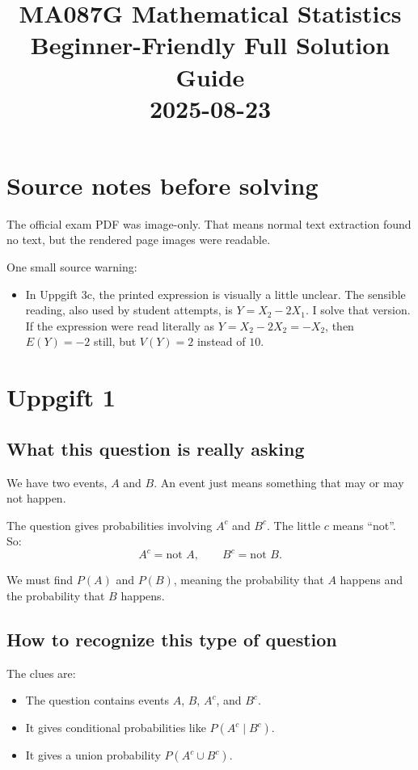 \documentclass[11pt,a4paper]{article}
\title{MA087G Mathematical Statistics\\Beginner-Friendly Full Solution Guide\\2025-08-23}
\author{}
\date{}
\begin{document}
\maketitle

\section*{Source notes before solving}
The official exam PDF was image-only. That means normal text extraction found no text, but the rendered page images were readable.

One small source warning:
\begin{itemize}[leftmargin=*]
    \item In Uppgift 3c, the printed expression is visually a little unclear. The sensible reading, also used by student attempts, is \(Y=X_2-2X_1\). I solve that version. If the expression were read literally as \(Y=X_2-2X_2=-X_2\), then \(E(Y)=-2\) still, but \(V(Y)=2\) instead of \(10\).
\end{itemize}

\section*{Uppgift 1}

\subsection*{What this question is really asking}
We have two events, \(A\) and \(B\). An event just means something that may or may not happen.

The question gives probabilities involving \(A^c\) and \(B^c\). The little \(c\) means ``not''. So:
\[
A^c=\text{not } A,\qquad B^c=\text{not } B.
\]

We must find \(P(A)\) and \(P(B)\), meaning the probability that \(A\) happens and the probability that \(B\) happens.

\subsection*{How to recognize this type of question}
The clues are:
\begin{itemize}[leftmargin=*]
    \item The question contains events \(A\), \(B\), \(A^c\), and \(B^c\).
    \item It gives conditional probabilities like \(P(A^c\mid B^c)\).
    \item It gives a union probability \(P(A^c\cup B^c)\).
\end{itemize}
\end{document}
